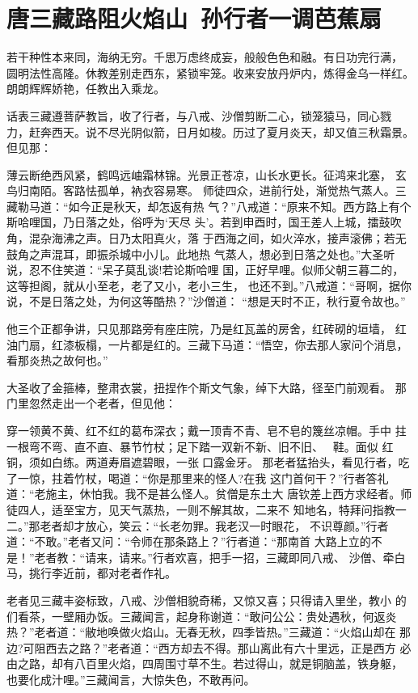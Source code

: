 \chapter{唐三藏路阻火焰山~孙行者一调芭蕉扇}

若干种性本来同，海纳无穷。千思万虑终成妄，般般色色和融。有日功完行满，
圆明法性高隆。休教差别走西东，紧锁牢笼。收来安放丹炉内，炼得金乌一样红。
朗朗辉辉娇艳，任教出入乘龙。

话表三藏遵菩萨教旨，收了行者，与八戒、沙僧剪断二心，锁笼猿马，同心戮
力，赶奔西天。说不尽光阴似箭，日月如梭。历过了夏月炎天，却又值三秋霜景。
但见那：

薄云断绝西风紧，鹤鸣远岫霜林锦。光景正苍凉，山长水更长。征鸿来北塞，
玄鸟归南陌。客路怯孤单，衲衣容易寒。
师徒四众，进前行处，渐觉热气蒸人。三藏勒马道：“如今正是秋天，却怎返有热
气？”八戒道：“原来不知。西方路上有个斯哈哩国，乃日落之处，俗呼为‘天尽
头’。若到申酉时，国王差人上城，擂鼓吹角，混杂海沸之声。日乃太阳真火，落
于西海之间，如火淬水，接声滚佛；若无鼓角之声混耳，即振杀城中小儿。此地热
气蒸人，想必到日落之处也。”大圣听说，忍不住笑道：“呆子莫乱谈!若论斯哈哩
国，正好早哩。似师父朝三暮二的，这等担阁，就从小至老，老了又小，老小三生，
也还不到。”八戒道：“哥啊，据你说，不是日落之处，为何这等酷热？”沙僧道：
“想是天时不正，秋行夏令故也。”

他三个正都争讲，只见那路旁有座庄院，乃是红瓦盖的房舍，红砖砌的垣墙，
红油门扇，红漆板榻，一片都是红的。三藏下马道：“悟空，你去那人家问个消息，
看那炎热之故何也。”

大圣收了金箍棒，整肃衣裳，扭捏作个斯文气象，绰下大路，径至门前观看。
那门里忽然走出一个老者，但见他：

穿一领黄不黄、红不红的葛布深衣；戴一顶青不青、皂不皂的篾丝凉帽。手中
拄一根弯不弯、直不直、暴节竹杖；足下踏一双新不新、旧不旧、鞋。面似
红铜，须如白练。两道寿眉遮碧眼，一张口露金牙。
那老者猛抬头，看见行者，吃了一惊，拄着竹杖，喝道：“你是那里来的怪人?在我
这门首何干？”行者答礼道：“老施主，休怕我。我不是甚么怪人。贫僧是东土大
唐钦差上西方求经者。师徒四人，适至宝方，见天气蒸热，一则不解其故，二来不
知地名，特拜问指教一二。”那老者却才放心，笑云：“长老勿罪。我老汉一时眼花，
不识尊颜。”行者道：“不敢。”老者又问：“令师在那条路上？”行者道：“那南首
大路上立的不是！”老者教：“请来，请来。”行者欢喜，把手一招，三藏即同八戒、
沙僧、牵白马，挑行李近前，都对老者作礼。

老者见三藏丰姿标致，八戒、沙僧相貌奇稀，又惊又喜；只得请入里坐，教小
的们看茶，一壁厢办饭。三藏闻言，起身称谢道：“敢问公公：贵处遇秋，何返炎
热？”老者道：“敝地唤做火焰山。无春无秋，四季皆热。”三藏道：“火焰山却在
那边?可阻西去之路？”老者道：“西方却去不得。那山离此有六十里远，正是西方
必由之路，却有八百里火焰，四周围寸草不生。若过得山，就是铜脑盖，铁身躯，
也要化成汁哩。”三藏闻言，大惊失色，不敢再问。

